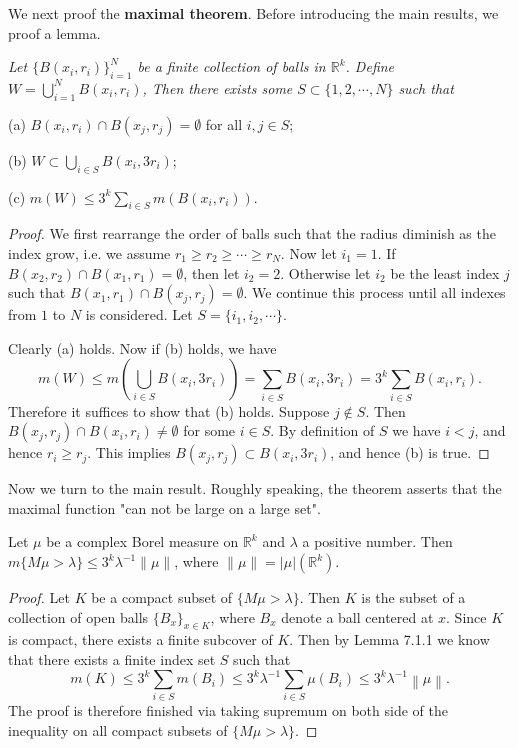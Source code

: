We next proof the \textbf{maximal theorem}. Before introducing the main results, we proof a lemma.
\begin{lemma}\em
Let $\{B(x_i,r_i)\}_{i=1}^N$ be a finite collection of balls in $\mathbb{R}^k$. Define $W=\bigcup_{i=1}^NB(x_i,r_i)$, Then there exists some $S\subset\{1,2,\cdots,N\}$ such that \par
(a) $B(x_i,r_i)\cap B(x_j,r_j)=\emptyset$ for all $i,j\in S$;\par
(b) $W\subset\bigcup_{i\in S}B(x_i,3r_i)$;\par
(c) $m(W)\le 3^k\sum_{i\in S}m(B(x_i,r_i))$.
\end{lemma}
\begin{proof}
We first rearrange the order of balls such that the radius diminish as the index grow, i.e. we assume $r_1\ge r_2\ge\cdots\ge r_N$. Now let $i_1=1$. If $B(x_2,r_2)\cap B(x_1,r_1)=\emptyset$, then let $i_2=2$. Otherwise let $i_2$ be the least index $j$ such that $B(x_1,r_1)\cap B(x_j,r_j)=\emptyset$. We continue this process until all indexes from $1$ to $N$ is considered. Let $S=\{i_1,i_2,\cdots\}$.\par
Clearly (a) holds. Now if (b) holds, we have 
$$
m\left( W \right) \le m\left( \bigcup_{i\in S}{B\left( x_i,3r_i \right)} \right) =\sum_{i\in S}{B\left( x_i,3r_i \right)}=3^k\sum_{i\in S}{B\left( x_i,r_i \right)}.
$$
Therefore it suffices to show that (b) holds. Suppose $j\notin S$. Then $B(x_j,r_j)\cap B(x_i,r_i)\ne\emptyset$ for some $i\in S$. By definition of $S$ we have $i<j$, and hence $r_i\ge r_j$. This implies $B(x_j,r_j)\subset B(x_i,3r_i)$, and hence (b) is true. 
\end{proof}
Now we turn to the main result. Roughly speaking, the theorem asserts that the maximal function "can not be large on a large set".
\begin{theorem}
Let $\mu$ be a complex Borel measure on $\mathbb{R}^k$ and $\lambda$ a positive number. Then $m\{M\mu>\lambda\}\le3^k\lambda^{-1}\|\mu\|$, where $\|\mu\|=|\mu|(\mathbb{R}^k)$.
\end{theorem}
\begin{proof}
Let $K$ be a compact subset of $\{M\mu>\lambda\}$. Then $K$ is the subset of a collection of open balls $\{B_x\}_{x\in K}$, where $B_x$ denote a ball centered at $x$. Since $K$ is compact, there exists a finite subcover of $K$. Then by Lemma 7.1.1 we know that there exists a finite index set $S$ such that 
$$
m\left( K \right) \le 3^k\sum_{i\in S}{m\left( B_i \right)}\le 3^k\lambda ^{-1}\sum_{i\in S}{\mu \left( B_i \right)}\le 3^k\lambda ^{-1}\left\| \mu \right\| .
$$
The proof is therefore finished via taking supremum on both side of the inequality on all compact subsets of $\{M\mu>\lambda\}$.
\end{proof}
